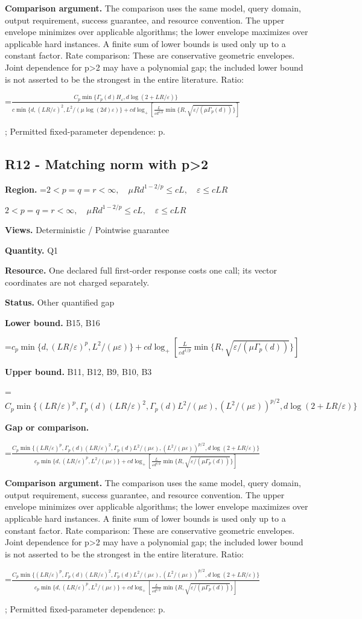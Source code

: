 \documentclass[10pt,a4paper]{article}
\newcommand{\AtlasMath}[1]{\par\begingroup\centering\setbox0=\hbox{$\displaystyle #1$}\ifdim\wd0>1.4\linewidth\typeout{ATLAS WIDE FORMULA: \the\wd0}\fi\ifdim\wd0>\linewidth\resizebox{\linewidth}{!}{\box0}\else\box0\fi\par\endgroup}
\newcommand{\AtlasInlineMath}[1]{\begingroup\setbox0=\hbox{$#1$}\ifdim\wd0>.4\linewidth\endgroup\AtlasMath{#1}\else\endgroup$#1$\fi}
\begin{document}
\textbf{Comparison argument.} The comparison uses the same model, query domain, output requirement, success guarantee, and resource convention. The upper envelope minimizes over applicable algorithms; the lower envelope maximizes over applicable hard instances. A finite sum of lower bounds is used only up to a constant factor. Rate comparison: These are conservative geometric envelopes. Joint dependence for p>2 may have a polynomial gap; the included lower bound is not asserted to be the strongest in the entire literature. Ratio: 
\AtlasMath{\frac{C_p\min\{\Gamma_p(d)H_\varepsilon,d\log(2+LR/\varepsilon)\}}{c\min\{d,(LR/\varepsilon)^2,L^2/(\mu\log(2d)\varepsilon)\}+cd\log_+[\frac{L}{\varepsilon d^{1/p}}\min\{R,\sqrt{\varepsilon/(\mu\Gamma_p(d))}\}]}}
; Permitted fixed-parameter dependence: p.

\subsection{R12 - Matching norm with p>2}
\textbf{Region.} \AtlasInlineMath{2<p=q=r<\infty,\quad\mu R d^{1-2/p}\le cL,\quad\varepsilon\le cLR}

\textbf{Views.} Deterministic / Pointwise guarantee

\textbf{Quantity.} Q1

\textbf{Resource.} One declared full first-order response costs one call; its vector coordinates are not charged separately.

\textbf{Status.} Other quantified gap

\textbf{Lower bound.} B15, B16

\AtlasMath{c_p\min\{d,(LR/\varepsilon)^p,L^2/(\mu\varepsilon)\}+cd\log_+[\frac{L}{\varepsilon d^{1/p}}\min\{R,\sqrt{\varepsilon/(\mu\Gamma_p(d))}\}]}
\textbf{Upper bound.} B11, B12, B9, B10, B3

\AtlasMath{C_p\min\{(LR/\varepsilon)^p,\Gamma_p(d)(LR/\varepsilon)^2,\Gamma_p(d)L^2/(\mu\varepsilon),(L^2/(\mu\varepsilon))^{p/2},d\log(2+LR/\varepsilon)\}}
\textbf{Gap or comparison.} 
\AtlasMath{\frac{C_p\min\{(LR/\varepsilon)^p,\Gamma_p(d)(LR/\varepsilon)^2,\Gamma_p(d)L^2/(\mu\varepsilon),(L^2/(\mu\varepsilon))^{p/2},d\log(2+LR/\varepsilon)\}}{c_p\min\{d,(LR/\varepsilon)^p,L^2/(\mu\varepsilon)\}+cd\log_+[\frac{L}{\varepsilon d^{1/p}}\min\{R,\sqrt{\varepsilon/(\mu\Gamma_p(d))}\}]}}


\textbf{Comparison argument.} The comparison uses the same model, query domain, output requirement, success guarantee, and resource convention. The upper envelope minimizes over applicable algorithms; the lower envelope maximizes over applicable hard instances. A finite sum of lower bounds is used only up to a constant factor. Rate comparison: These are conservative geometric envelopes. Joint dependence for p>2 may have a polynomial gap; the included lower bound is not asserted to be the strongest in the entire literature. Ratio: 
\AtlasMath{\frac{C_p\min\{(LR/\varepsilon)^p,\Gamma_p(d)(LR/\varepsilon)^2,\Gamma_p(d)L^2/(\mu\varepsilon),(L^2/(\mu\varepsilon))^{p/2},d\log(2+LR/\varepsilon)\}}{c_p\min\{d,(LR/\varepsilon)^p,L^2/(\mu\varepsilon)\}+cd\log_+[\frac{L}{\varepsilon d^{1/p}}\min\{R,\sqrt{\varepsilon/(\mu\Gamma_p(d))}\}]}}
; Permitted fixed-parameter dependence: p.
\end{document}

